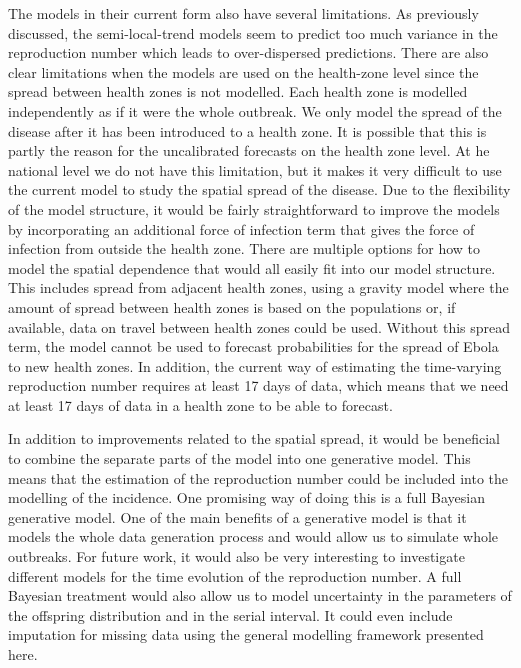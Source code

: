 \documentclass[12pt]{article}
\begin{document}
The models in their current form also have several limitations. As previously discussed, the semi-local-trend models seem to predict too much variance in the reproduction number which leads to over-dispersed predictions. There are also clear limitations when the models are used on the health-zone level since the spread between health zones is not modelled. Each health zone is modelled independently as if it were the whole outbreak. We only model the spread of the disease after it has been introduced to a health zone. It is possible that this is partly the reason for the uncalibrated forecasts on the health zone level. At he national level we do not have this limitation, but it makes it very difficult to use the current model to study the spatial spread of the disease. Due to the flexibility of the model structure, it would be fairly straightforward to improve the models by incorporating an additional force of infection term that gives the force of infection from outside the health zone. There are multiple options for how to model the spatial dependence that would all easily fit into our model structure. This includes spread from adjacent health zones, using a gravity model where the amount of spread between health zones is based on the populations \cite{haynesGravitySpatialInteraction1985} or, if available, data on travel between health zones could be used. Without this spread term, the model cannot be used to forecast probabilities for the spread of Ebola to new health zones. In addition, the current way of estimating the time-varying reproduction number requires at least 17 days of data, which means that we need at least 17 days of data in a health zone to be able to forecast.

In addition to improvements related to the spatial spread, it would be beneficial to combine the separate parts of the model into one generative model. This means that the estimation of the reproduction number could be included into the modelling of the incidence. One promising way of doing this is a full Bayesian generative model. One of the main benefits of a generative model is that it models the whole data generation process and would allow us to simulate whole outbreaks. For future work, it would also be very interesting to investigate different models for the time evolution of the reproduction number. A full Bayesian treatment would also allow us to model uncertainty in the parameters of the offspring distribution and in the serial interval. It could even include imputation for missing data using the general modelling framework presented here.
\end{document}
